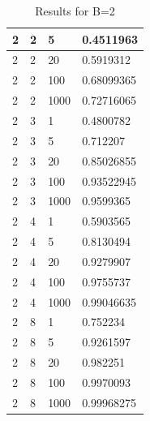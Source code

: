 \documentclass[11pt]{article}
\begin{document}
\begin{table}
{\begin{tabular}{|l|l|l|l|}
2          & 2          & 5        &0.4511963 \\ \hline
2          & 2          & 20        &0.5919312 \\ \hline
2          & 2          & 100        &0.68099365 \\ \hline
2          & 2          & 1000        &0.72716065 \\ \hline
2          & 3          & 1        &0.4800782 \\ \hline
2          & 3          & 5        &0.712207 \\ \hline
2          & 3          & 20        &0.85026855 \\ \hline
2          & 3          & 100        &0.93522945 \\ \hline
2          & 3          & 1000        &0.9599365 \\ \hline
2          & 4          & 1        &0.5903565 \\ \hline
2          & 4          & 5        &0.8130494 \\ \hline
2          & 4          & 20        &0.9279907 \\ \hline
2          & 4          & 100        &0.9755737 \\ \hline
2          & 4          & 1000        &0.99046635 \\ \hline
2          & 8          & 1        &0.752234 \\ \hline
2          & 8          & 5        &0.9261597 \\ \hline
2          & 8          & 20        &0.982251 \\ \hline
2          & 8          & 100        &0.9970093 \\ \hline
2          & 8          & 1000        &0.99968275 \\ \hline
\end{tabular}
\caption{Results for B=2}
}
\end{table}
\end{document}
